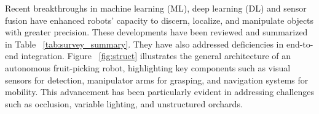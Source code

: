 \documentclass[a4paper,fleqn]{cas-dc}
\begin{document}
Recent breakthroughs in machine learning (ML), deep learning (DL) and sensor fusion have enhanced robots' capacity to discern, localize, and manipulate objects with greater precision. These developments have been reviewed and summarized in Table ~\ref{tab:survey_summary}. They have also addressed deficiencies in end-to-end integration.
 Figure ~\ref{fig:struct} illustrates the general architecture of an autonomous fruit-picking robot, highlighting key components such as visual sensors for detection, manipulator arms for grasping, and navigation systems for mobility. This advancement has been particularly evident in addressing challenges such as occlusion, variable lighting, and unstructured orchards.
\end{document}
